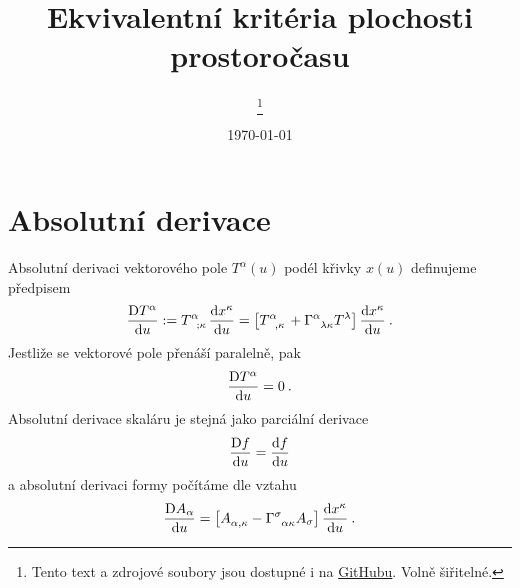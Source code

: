 \documentclass{article}
\title{Ekvivalentní kritéria plochosti prostoročasu}
\author{\spacedlowsmallcaps{Miroslav Burýšek, Filip Novotný, Tomáš Tesař}\footnote{Tento text a zdrojové soubory jsou dostupné i na \href{https://github.com/mejroslav/plochy-prostorocas.git}{GitHubu}. Volně šiřitelné.}}
\date{\today}
\begin{document}
\renewcommand{\sectionmark}[1]{\markright{\spacedlowsmallcaps{#1}}} %
\lehead{\mbox{\llap{\small\thepage\kern1em\color{halfgray} \vline}\color{halfgray}\hspace{0.5em}\rightmark\hfil}} %

\pagestyle{scrheadings} %


\maketitle



\section*{Absolutní derivace}

Absolutní derivaci vektorového pole $T^\alpha(u)$ podél křivky $x(u)$ definujeme předpisem
\begin{align}
    \ader{T^\alpha}{u} := T\indices{^\alpha_;_\kappa} \der{x^\kappa}{u} = \left[ T\indices{^\alpha_,_\kappa} + \Gamma\indices{^\alpha_\lambda_\kappa} T^\lambda \right] \der{x^\kappa}{u} \:.
\end{align}
Jestliže se vektorové pole přenáší paralelně, pak \begin{align}
    \frac{\mathrm{D} T^\alpha}{\mathrm{d} u} = 0 \:.
\end{align}
Absolutní derivace skaláru je stejná jako parciální derivace
\begin{align}
    \frac{\mathrm{D} f}{\mathrm{d} u} = \frac{\mathrm{d}f}{\mathrm{d}u}
\end{align}
a absolutní derivaci formy počítáme dle vztahu
\begin{align}
    \ader{A_\alpha}{u} = \left[ A\indices{_\alpha_,_\kappa} - \Gamma\indices{^\sigma_\alpha_\kappa} A_{\sigma} \right] \der{x^\kappa}{u} \:.
\end{align}
\end{document}
